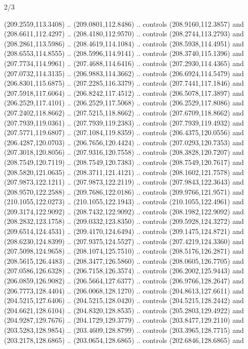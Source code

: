 \begin{flagdescription}{2/3}
\begin{scope}[xshift=0.5\flaglength,yshift=0.5\flagwidth,scale=\flagwidth/180]
\begin{scope}[y=0.8pt, x=0.8pt, yscale=-1,shift={(-168.75,-108.75)}]
  (209.2559,113.3408) .. (209.0801,112.8486) .. controls (208.9160,112.3857) and
  (208.6611,112.4297) .. (208.4180,112.9570) .. controls (208.2744,113.2793) and
  (208.2861,113.5986) .. (208.4619,114.1084) .. controls (208.5938,114.4951) and
  (208.6553,114.8555) .. (208.5996,114.9141) .. controls (208.3740,115.1396) and
  (207.7734,114.9961) .. (207.4688,114.6416) .. controls (207.2930,114.4365) and
  (207.0732,114.3135) .. (206.9883,114.3662) .. controls (206.6924,114.5479) and
  (206.8301,115.6875) .. (207.2285,116.3379) .. controls (207.7441,117.1846) and
  (207.5918,117.6064) .. (206.8242,117.4512) .. controls (206.5078,117.3897) and
  (206.2529,117.4101) .. (206.2529,117.5068) .. controls (206.2529,117.8086) and
  (207.2402,118.8662) .. (207.5215,118.8662) .. controls (207.6709,118.8662) and
  (207.7939,119.0361) .. (207.7939,119.2383) .. controls (207.7939,119.4932) and
  (207.5771,119.6807) .. (207.1084,119.8359) .. controls (206.4375,120.0556) and
  (206.4287,120.0703) .. (206.7656,120.4424) .. controls (207.0293,120.7353) and
  (207.3018,120.8056) .. (207.9316,120.7558) .. controls (208.3828,120.7207) and
  (208.7549,120.7119) .. (208.7549,120.7383) .. controls (208.7549,120.7617) and
  (208.5820,121.0635) .. (208.3711,121.4121) .. controls (208.1602,121.7578) and
  (207.9873,122.1211) .. (207.9873,122.2119) .. controls (207.9843,122.3643) and
  (208.9570,122.2588) .. (209.7686,122.0186) .. controls (209.9766,121.9571) and
  (210.1055,122.0273) .. (210.1055,122.1943) .. controls (210.1055,122.4961) and
  (209.3174,122.9092) .. (208.7432,122.9092) .. controls (208.1982,122.9092) and
  (208.2832,123.1758) .. (209.0332,123.8350) .. controls (209.5928,124.3272) and
  (209.6514,124.4531) .. (209.4170,124.6494) .. controls (209.1475,124.8721) and
  (208.6230,124.8399) .. (207.9375,124.5527) .. controls (207.4219,124.3360) and
  (207.5098,124.9658) .. (208.1074,125.7510) .. controls (208.5176,126.2871) and
  (208.5615,126.4483) .. (208.3477,126.5860) .. controls (208.0605,126.7705) and
  (207.0586,126.6328) .. (206.7158,126.3574) .. controls (206.2002,125.9443) and
  (206.0859,126.9082) .. (206.5664,127.6377) .. controls (206.9766,128.2647) and
  (206.7773,128.4404) .. (206.0068,128.1270) .. controls (204.8613,127.6611) and
  (204.5215,127.6406) .. (204.5215,128.0420) .. controls (204.5215,128.2442) and
  (204.6621,128.6104) .. (204.8320,128.8535) .. controls (205.2803,129.4922) and
  (204.9287,129.7676) .. (204.1729,129.3779) .. controls (203.8477,129.2110) and
  (203.5283,128.9854) .. (203.4609,128.8799) .. controls (203.3965,128.7715) and
  (203.2178,128.6865) .. (203.0654,128.6865) .. controls (202.6846,128.6865) and

\end{scope}
\end{scope}
\end{flagdescription}

